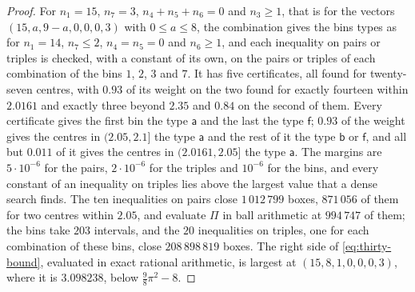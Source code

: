 \documentclass[11pt,reqno]{amsart}
\renewcommand{\_}{\origunderscore\allowbreak}
\numberwithin{equation}{section}
\theoremstyle{plain}
\theoremstyle{definition}
\theoremstyle{remark}
\begin{document}
\begin{proof}
For $n_1=15$, $n_7=3$, $n_4+n_5+n_6=0$ and $n_3\ge1$, that is for the
vectors $(15,a,9-a,0,0,0,3)$ with $0\le a\le8$, the combination gives the
bins types as for $n_1=14$, $n_7\le2$, $n_4=n_5=0$ and $n_6\ge1$, and
each inequality on pairs or triples is checked, with a constant of its
own, on the pairs or triples of each combination of the bins $1$, $2$, $3$
and $7$. It has five certificates, all found for twenty-seven centres,
with $0.93$ of its weight on the two found for exactly fourteen within
$2.0161$ and exactly three beyond $2.35$ and $0.84$ on the second of them.
Every certificate gives the first bin the type $\mathsf a$ and the last
the type $\mathsf f$; $0.93$ of the weight gives the centres in
$(2.05,2.1]$ the type $\mathsf a$ and the rest of it the type $\mathsf b$
or $\mathsf f$, and all but $0.011$ of it gives the centres in
$(2.0161,2.05]$ the type $\mathsf a$. The margins are $5\cdot10^{-6}$ for
the pairs, $2\cdot10^{-6}$ for the triples and $10^{-6}$ for the bins, and
every constant of an inequality on triples lies above the largest value
that a dense search finds. The ten inequalities on pairs close
$1\,012\,799$ boxes, $871\,056$ of them for two centres within $2.05$, and
evaluate $\Pi$ in ball arithmetic at $994\,747$ of them; the bins take
$203$ intervals, and the $20$ inequalities on triples, one for each
combination of these bins, close $208\,898\,819$ boxes. The right side of
\eqref{eq:thirty-bound}, evaluated in exact rational arithmetic, is largest
at $(15,8,1,0,0,0,3)$, where it is $3.098238$, below $\frac98\pi^2-8$.


\end{proof}
\end{document}
